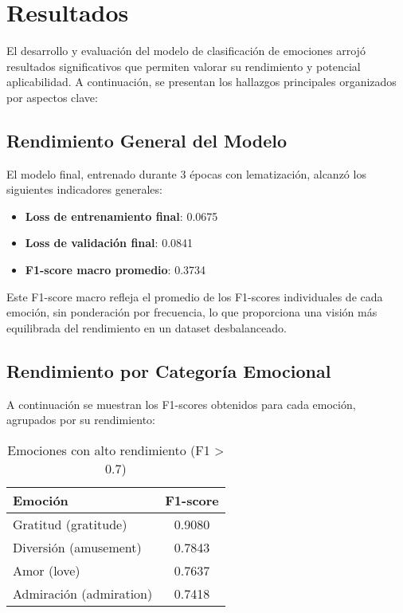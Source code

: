\documentclass[12pt,a4paper]{report}
\begin{document}
\section{Resultados}

El desarrollo y evaluación del modelo de clasificación de emociones arrojó resultados significativos que permiten valorar su rendimiento y potencial aplicabilidad. A continuación, se presentan los hallazgos principales organizados por aspectos clave:

\subsection{Rendimiento General del Modelo}

El modelo final, entrenado durante 3 épocas con lematización, alcanzó los siguientes indicadores generales:
\begin{itemize}
  \item \textbf{Loss de entrenamiento final}: 0.0675
  \item \textbf{Loss de validación final}: 0.0841
  \item \textbf{F1-score macro promedio}: 0.3734
\end{itemize}

Este F1-score macro refleja el promedio de los F1-scores individuales de cada emoción, sin ponderación por frecuencia, lo que proporciona una visión más equilibrada del rendimiento en un dataset desbalanceado.

\subsection{Rendimiento por Categoría Emocional}

A continuación se muestran los F1-scores obtenidos para cada emoción, agrupados por su rendimiento:

\begin{table}[htbp]
  \centering
  \caption{Emociones con alto rendimiento (F1 > 0.7)}
  \begin{tabular}{lc}
    \toprule
    \textbf{Emoción} & \textbf{F1-score} \\
    \midrule
    Gratitud (gratitude) & 0.9080 \\
    Diversión (amusement) & 0.7843 \\
    Amor (love) & 0.7637 \\
    Admiración (admiration) & 0.7418 \\
    \bottomrule
  \end{tabular}
\end{table}
\end{document}
